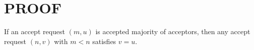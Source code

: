 \documentclass{article}
\begin{document}

\section{PROOF}


\begin{theorem}
	\label{theorem:1}
	If an accept request $(m, u)$ is accepted majority of acceptors, then any accept request $(n, v)$ with $m < n$ satisfies $v = u$.
\end{theorem}
\end{document}
